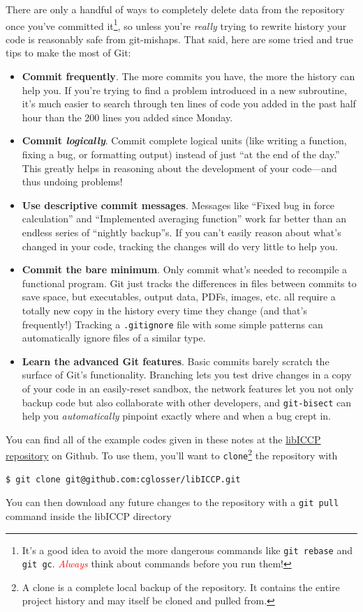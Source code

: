 There are only a handful of ways to completely delete data from the repository once you've committed it\footnote{It's a good idea to avoid the more dangerous commands like \texttt{git rebase} and \texttt{git gc}. \textcolor{red}{\emph{Always}} think about commands before you run them!}, so unless you're \emph{really} trying to rewrite history your code is reasonably safe from git-mishaps.
That said, here are some tried and true tips to make the most of Git:
\begin{itemize}
  \item \textbf{Commit frequently}. The more commits you have, the more the history can help you.
    If you're trying to find a problem introduced in a new subroutine, it's much easier to search through ten lines of code you added in the past half hour than the 200 lines you added since Monday.
  \item \textbf{Commit \emph{logically}}. Commit complete logical units (like writing a function, fixing a bug, or formatting output) instead of just ``at the end of the day.''
    This greatly helps in reasoning about the development of your code---and thus undoing problems!
  \item \textbf{Use descriptive commit messages}. Messages like ``Fixed bug in force calculation'' and ``Implemented averaging function'' work far better than an endless series of ``nightly backup''s.
    If you can't easily reason about what's changed in your code, tracking the changes will do very little to help you.
  \item \textbf{Commit the bare minimum}. Only commit what's needed to recompile a functional program.
    Git just tracks the differences in files between commits to save space, but executables, output data, PDFs, images, etc. all require a totally new copy in the history every time they change (and that's frequently!)
    Tracking a \texttt{.gitignore} file with some simple patterns can automatically ignore files of a similar type.
  \item \textbf{Learn the advanced Git features}. Basic commits barely scratch the surface of Git's functionality.
    Branching lets you test drive changes in a copy of your code in an easily-reset sandbox, the network features let you not only backup code but also collaborate with other developers, and \texttt{git-bisect} can help you \emph{automatically} pinpoint exactly where and when a bug crept in.
\end{itemize}

You can find all of the example codes given in these notes at the \href{https://Github.com/cglosser/libICCP}{libICCP repository} on Github.
To use them, you'll want to \texttt{clone}\footnote{A clone is a complete local backup of the repository. It contains the entire project history and may itself be cloned and pulled from.} the repository with
\begin{verbatim}
$ git clone git@github.com:cglosser/libICCP.git
\end{verbatim}
You can then download any future changes to the repository with a \texttt{git pull} command inside the libICCP directory

